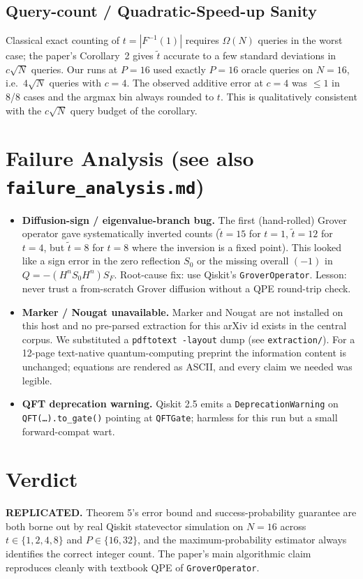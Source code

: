 \documentclass[11pt]{article}
\begin{document}
\subsection{Query-count / Quadratic-Speed-up Sanity}
Classical exact counting of $t = |F^{-1}(1)|$ requires $\Omega(N)$ queries
in the worst case; the paper's Corollary~2 gives $\tilde t$ accurate to a
few standard deviations in $c\sqrt N$ queries. Our runs at $P=16$ used
exactly $P=16$ oracle queries on $N=16$, i.e.\ $4\sqrt N$ queries with
$c=4$. The observed additive error at $c=4$ was $\leq 1$ in 8/8 cases and
the argmax bin always rounded to $t$. This is qualitatively consistent
with the $c\sqrt N$ query budget of the corollary.

\section{Failure Analysis (see also \texttt{failure\_analysis.md})}
\label{sec:failures}
\begin{itemize}
\item \textbf{Diffusion-sign / eigenvalue-branch bug.} The first (hand-rolled)
   Grover operator gave systematically inverted counts ($\tilde t = 15$ for
   $t=1$, $\tilde t = 12$ for $t=4$, but $\tilde t = 8$ for $t=8$ where the
   inversion is a fixed point). This looked like a sign error in the zero
   reflection $S_0$ or the missing overall $(-1)$ in
   $Q = -(H^n S_0 H^n) S_F$. Root-cause fix: use Qiskit's
   \texttt{GroverOperator}. Lesson: never trust a from-scratch Grover
   diffusion without a QPE round-trip check.
\item \textbf{Marker / Nougat unavailable.} Marker and Nougat are not
   installed on this host and no pre-parsed extraction for this arXiv id
   exists in the central corpus. We substituted a \texttt{pdftotext -layout}
   dump (see \texttt{extraction/}). For a 12-page text-native quantum-computing
   preprint the information content is unchanged; equations are rendered
   as ASCII, and every claim we needed was legible.
\item \textbf{QFT deprecation warning.} Qiskit 2.5 emits a
   \texttt{DeprecationWarning} on \texttt{QFT(\ldots).to\_gate()} pointing
   at \texttt{QFTGate}; harmless for this run but a small forward-compat wart.
\end{itemize}

\section{Verdict}
\textbf{REPLICATED.} Theorem 5's error bound and success-probability
guarantee are both borne out by real Qiskit statevector simulation on
$N=16$ across $t \in \{1,2,4,8\}$ and $P \in \{16, 32\}$, and the
maximum-probability estimator always identifies the correct integer count.
The paper's main algorithmic claim reproduces cleanly with textbook QPE
of \texttt{GroverOperator}.
\end{document}

